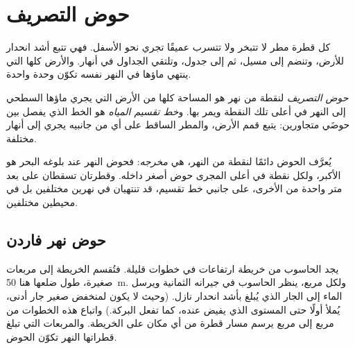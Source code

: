 \section{حوض التصريف}

كل قطرة مطر لا تتبخر ولا تتسرب عميقًا تجري نحو الأسفل. فهي تتبع أشد انحدار للأرض،
وتنضم إلى مسيل، ثم إلى جدول، وتلتقي الجداول في أنهار. والأرض كلها التي ينتهي
ماؤها في النهر نفسه تكوّن وحدة واحدة.

\begin{definition}\label{def:g10:drainage-basins:drainage-basin}
\emph{حوض التصريف} لنقطة من نهر هو المساحة كلها من الأرض التي
يجري ماؤها السطحي إلى النهر في أعلى تلك النقطة ويمر بها. و\emph{خط تقسيم
المياه} هو الخط الذي يفصل بين حوضَي  متجاورين: يتبع
قمم الأرض، والمطر الساقط على أي من جانبيه يجري إلى أنهار
مختلفة.
\end{definition}

يُعرَّف الحوض دائمًا لنقطة من النهر، هي \emph{مخرجه}: فحوض النهر عند بلوغه البحر
هو الأكبر، ولكل نقطة في أعلى المجرى حوض أصغر داخله. وقطرتان تسقطان على بعد متر
واحدة من الأخرى، على جانبي خط تقسيم، قد تنتهيان في نهرين مختلفين بل في محيطين
مختلفين.

\subsection*{حوض نهر فاردن}

يجد الحاسوب  من خريطة ارتفاعات في خطوات قليلة. فتُقسم الخريطة إلى مربعات
صغيرة، طول ضلعها هنا \qty{50}{m}. ولكل مربع، ينظر الحاسوب في جيرانه الثمانية ويرسل
الماء إلى الجار الذي يُبلغ بأشد انحدار نازل. (وحيث لا يكون لمنخفض صغير جار أدنى،
يُملأ أولًا حتى المستوى الذي يفيض عنده، كما تفعل البركة.) واتباع هذه الخطوات من مربع
إلى مربع يرسم مسار قطرة من أي مكان على الخريطة. والمربعات التي تبلغ قطراتها النهر
تكوّن الحوض.

